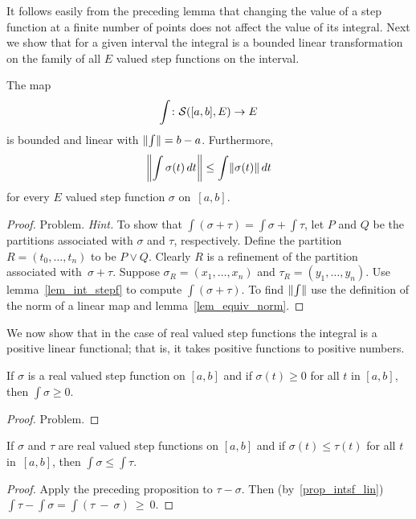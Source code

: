 It follows easily from the preceding lemma that changing the value of a step function at a
finite number of points does not affect the value of its integral.  Next we show that for a
given interval the integral is a bounded linear transformation on the family of all $E$ valued
step functions on the interval.

\begin{prop}\label{prop_intsf_lin}  The map
  \[ \int \colon \mathcal{S}([a,b],E) \rightarrow E \]
is bounded and linear with $\lVert\int\rVert = b - a$.  Furthermore,
  \[ \biggl\|\int\sigma(t)\,dt\biggr\| \le \int \lVert\sigma(t)\rVert\,dt \]
for every $E$ valued step function $\sigma$ on~$[a,b]$.
\end{prop}

\begin{proof} Problem. \emph{Hint.} To show that $\int(\sigma + \tau) = \int\sigma + \int\tau$,
let $P$ and $Q$ be the partitions associated with $\sigma$ and $\tau$, respectively.  Define
the partition $R = (t_0, \dots, t_n)$ to be $P \lor Q$.  Clearly $R$ is a refinement of the
partition associated with~$\sigma + \tau$. Suppose $\sigma_R = (x_1, \dots, x_n)$ and $\tau_R
= (y_1, \dots, y_n)$.  Use lemma~\ref{lem_int_stepf} to compute $\int(\sigma + \tau)$.  To
find $\lVert\int\rVert$ use the definition of the norm of a linear map and
lemma~\ref{lem_equiv_norm}.  \ns
\end{proof}

We now show that in the case of real valued step functions the integral is a positive linear
functional; that is, it takes positive functions to positive numbers.

\begin{prop}\label{prop_int_pos} If $\sigma$ is a real valued step function on $[a,b]$ and if
$\sigma(t) \ge 0$ for all $t$ in $[a,b]$, then $\int\sigma \ge 0$.
\end{prop}

\begin{proof} Problem.  \ns  \end{proof}

\begin{cor}  If $\sigma$ and $\tau$ are real valued step functions on $[a,b]$ and if
$\sigma(t) \le \tau(t)$ for all $t$ in~$[a,b]$, then $\int\sigma \le \int\tau$.
\end{cor}

\begin{proof}  Apply the preceding proposition to $\tau - \sigma$. Then (by~\ref{prop_intsf_lin})
$\int\tau - \int\sigma = \int(\tau~-~\sigma)~\ge~0$.
\end{proof}

